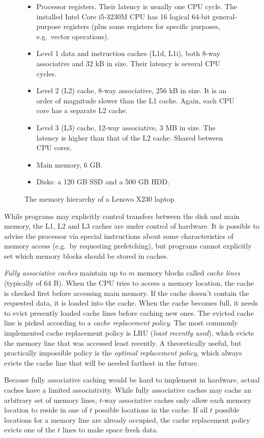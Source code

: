 \begin{figure}
\begin{itemize}
\item Processor registers. Their latency is usually one CPU cycle.
	The installed Intel Core i5-3230M CPU has 16 logical 64-bit
	general-purpose registers (plus some registers for specific purposes,
	e.g.\ vector operations).
\item Level 1 data and instruction caches (L1d, L1i), both 8-way associative
	and 32 kB in size. Their latency is several CPU cycles.
\item Level 2 (L2) cache, 8-way associative, 256 kB in size.
	It is an order of magnitude slower than the L1 cache. Again, each
	CPU core has a separate L2 cache.
\item Level 3 (L3) cache, 12-way associative, 3 MB in size.
	The latency is higher than that of the L2 cache. Shared between CPU
	cores.
\item Main memory, 6 GB.
\item Disks: a 120 GB SSD and a 500 GB HDD.
\end{itemize}
\caption{The memory hierarchy of a Lenovo X230 laptop}
\end{figure}

While programs may explicitly control transfers between the disk and main
memory, the L1, L2 and L3 caches are under control of hardware.
It is possible to advise the processor via special instructions about some
characteristics of memory access (e.g.\ by requesting prefetching), but programs
cannot explicitly set which memory blocks should be stored in caches.

\emph{Fully associative caches} maintain up to $m$ memory blocks called
\textit{cache lines} (typically of 64 B). When the CPU tries to access
a memory location, the cache is checked first before accessing main memory.
If the cache doesn't contain the requested data, it is loaded into the cache.
When the cache becomes full, it needs to evict presently loaded cache lines
before caching new ones. The evicted cache line is picked according
to a \emph{cache replacement policy}. The most commonly implemented cache
replacement policy is LRU (\emph{least recently used}), which evicts
the memory line that was accessed least recently.
A theoretically useful, but practically impossible policy is the \emph{optimal
replacement policy}, which always evicts the cache line that will be needed
farthest in the future.

Because fully associative caching would be hard to implement in hardware,
actual caches have a limited associativity. While fully associative
caches may cache an arbitrary set of memory lines, $t$-way associative
caches only allow each memory location to reside in one of $t$ possible
locations in the cache. If all $t$ possible locations for a memory line
are already occupied, the cache replacement policy evicts one of the $t$
lines to make space fresh data.

